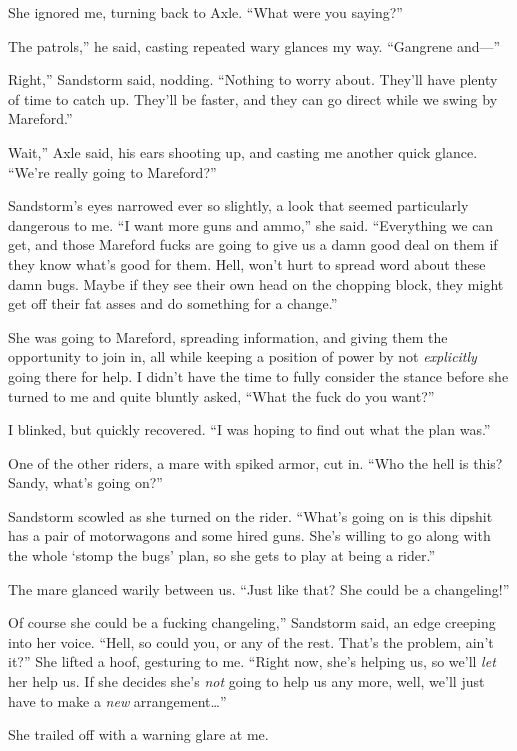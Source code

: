 She ignored me, turning back to Axle. “What were you saying?”

\leavevmode{}The patrols,” he said, casting repeated wary glances my way. “Gangrene and—”

\leavevmode{}Right,” Sandstorm said, nodding. “Nothing to worry about. They’ll have plenty of time to catch up. They’ll be faster, and they can go direct while we swing by Mareford.”

\leavevmode{}Wait,” Axle said, his ears shooting up, and casting me another quick glance. “We’re really going to Mareford?”

Sandstorm’s eyes narrowed ever so slightly, a look that seemed particularly dangerous to me. “I want more guns and ammo,” she said. “Everything we can get, and those Mareford fucks are going to give us a damn good deal on them if they know what’s good for them. Hell, won’t hurt to spread word about these damn bugs. Maybe if they see their own head on the chopping block, they might get off their fat asses and do something for a change.”

She was going to Mareford, spreading information, and giving them the opportunity to join in, all while keeping a position of power by not \textit{explicitly} going there for help. I didn’t have the time to fully consider the stance before she turned to me and quite bluntly asked, “What the fuck do you want?”

I blinked, but quickly recovered. “I was hoping to find out what the plan was.”

One of the other riders, a mare with spiked armor, cut in. “Who the hell is this? Sandy, what’s going on?”

Sandstorm scowled as she turned on the rider. “What’s going on is this dipshit has a pair of motorwagons and some hired guns. She’s willing to go along with the whole ‘stomp the bugs’ plan, so she gets to play at being a rider.”

The mare glanced warily between us. “Just like that? She could be a changeling!”

\leavevmode{}Of course she could be a fucking changeling,” Sandstorm said, an edge creeping into her voice. “Hell, so could you, or any of the rest. That’s the problem, ain’t it?” She lifted a hoof, gesturing to me. “Right now, she’s helping us, so we’ll \textit{let} her help us. If she decides she’s \textit{not} going to help us any more, well, we’ll just have to make a \textit{new} arrangement…”

She trailed off with a warning glare at me.


